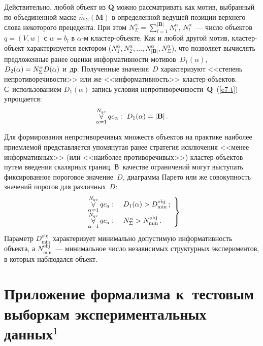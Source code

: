 \begin{multicols}{2}
Действительно, любой объект из $\mathbf{Q}$ можно рассматривать как мотив,
выбранный по объединенной маске $\hat{m}_\Sigma(\mathbf{M})$ в определенной
ведущей позиции верхнего слова некоторого прецедента.
При этом $N_\Sigma^\alpha =\sum\limits_{l=1}^{\vert \mathbf{B}\vert} N_l^\alpha$,
$N_l^\alpha$~---  чис\-ло объектов  $q=(V,w)$ с $w=b_l$ в $\alpha$-м клас\-тер-объ\-ек\-те.
Как и любой
другой мотив, клас\-тер-объект характеризуется вектором ($N_1^\alpha, N_2^\alpha,
\ldots , N^\alpha_{\vert \mathbf{B}\vert}, N_\Sigma^\alpha$), что позволяет вы\-чис\-лять
предложенные ранее оценки ин\-фор\-ма\-тив\-ности мотивов~$D_1(\alpha)$,
$D_2(\alpha)\hm=N_\Sigma^\alpha D(\alpha)$ и~др. Полученные значения~$D$
характеризуют <<степень непротиворечивости>> или же
<<информативность>> клас\-тер-объ\-ек\-тов. С~использованием $D_1(\alpha)$ запись
условия непротиворечивости~$\mathbf{Q}$~(\ref{e7-t}) упрощается:
\begin{equation*}
\mathop{\forall}\limits_{\alpha=1}^{N_{qc}}  qc_\alpha:\ D_1(\alpha)=\vert \mathbf{B}\vert\,.
\end{equation*}

Для формирования непротиворечивых множеств объектов на практике
наиболее приемлемой представляется упомянутая ранее стратегия
исключения <<менее информативных>> (или <<наиболее
противоречивых>>) клас\-тер-объек\-тов путем введения скалярных границ.
В~качестве ограничений могут выступать фиксированное пороговое
значение~$D$, диаграмма Парето или же совокупность значений порогов для
различных~$D$:
\begin{equation}
\left.
\begin{array}{rl}
\mathop{\forall}\limits_{\alpha=1}^{N_{qc}} qc_a: & \ D_1(\alpha)>D_{\min}^{\mathrm{obj}}\,;\\
\mathop{\forall}\limits_{\alpha=1}^{N_{qc}} qc_a: & \ N_\Sigma^\alpha>N_{\min}^{\mathrm{obj}}\,.
\end{array}
\right\}
\label{e8-t}
\end{equation}
Параметр $D_{\min}^{\mathrm{obj}}$ характеризует минимально до\-пус\-тимую
информативность объекта, а $N_{\min}^{\mathrm{obj}}$~--- минимальное чис\-ло
независимых структурных экспериментов, в которых наблюдался объект.

\section{Приложение формализма к~тестовым выборкам
экспериментальных данных$^1$}


\end{multicols}
